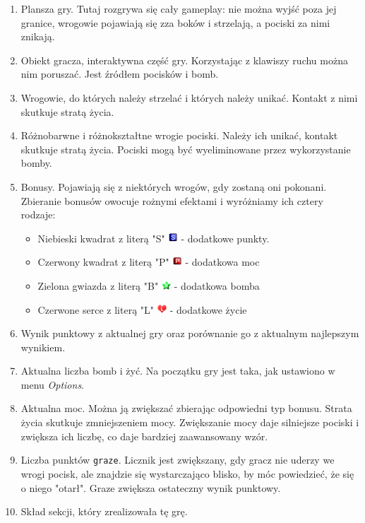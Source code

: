 		\begin{enumerate}
			\item Plansza gry. Tutaj rozgrywa się cały gameplay: nie można wyjść poza jej granice, wrogowie pojawiają się zza boków i strzelają, a pociski za nimi znikają.
			\item Obiekt gracza, interaktywna część gry. Korzystając z klawiszy ruchu można nim poruszać. Jest źródłem pocisków i bomb.
			\item Wrogowie, do których należy strzelać i których należy unikać. Kontakt z nimi skutkuje stratą życia.
			\item Różnobarwne i różnokształtne wrogie pociski. Należy ich unikać, kontakt skutkuje stratą życia. Pociski mogą być wyeliminowane przez wykorzystanie bomby.
			\item Bonusy. Pojawiają się z niektórych wrogów, gdy zostaną oni pokonani. Zbieranie bonusów owocuje rożnymi efektami i wyróżniamy ich cztery rodzaje:
			\begin{itemize}
				\item Niebieski kwadrat z literą "S" \tab \includegraphics[width=10pt]{./images/bonusScore} \tab - dodatkowe punkty.
				\item Czerwony kwadrat z literą "P" \tab \includegraphics[width=10pt]{./images/bonusPower} \tab - dodatkowa moc
				\item Zielona gwiazda z literą "B" \tab \includegraphics[width=10pt]{./images/bonusBomb} \tab - dodatkowa bomba
				\item Czerwone serce z literą "L" \tab \includegraphics[width=10pt]{./images/bonusLife} \tab - dodatkowe życie
			\end{itemize}
			\item Wynik punktowy z aktualnej gry oraz porównanie go z aktualnym najlepszym wynikiem.
			\item Aktualna liczba bomb i żyć. Na początku gry jest taka, jak ustawiono w menu \emph{Options}.
			\item Aktualna moc. Można ją zwiększać zbierając odpowiedni typ bonusu. Strata życia skutkuje zmniejszeniem mocy. Zwiększanie mocy daje silniejsze pociski i zwiększa ich liczbę, co daje bardziej zaawansowany wzór.
			\item Liczba punktów \texttt{graze}. Licznik jest zwiększany, gdy gracz nie uderzy we wrogi pocisk, ale znajdzie się wystarczająco blisko, by móc powiedzieć, że się o niego "otarł". Graze zwiększa ostateczny wynik punktowy.
			\item Skład sekcji, który zrealizowała tę grę.
		\end{enumerate}
		
		
		
		
		
		
